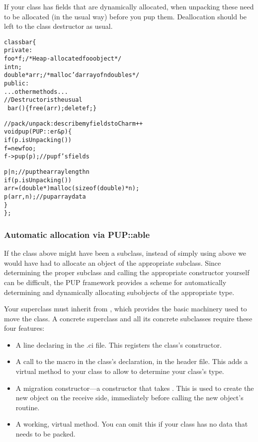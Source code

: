 If your class has fields that are dynamically allocated, when unpacking
these need to be allocated (in the usual way) before you pup them.
Deallocation should be left to the class destructor as usual.

\begin{alltt}
class bar \{
private:
    foo *f; /*Heap-allocated foo object*/
    int n;
    double *arr;/*malloc'd array of n doubles*/
public:
    ...other methods...
    //Destructor is the usual
    ~bar() \{free(arr);delete f;\}
    
    //pack/unpack: describe my fields to Charm++
    void pup(PUP::er &p) \{
      if (p.isUnpacking()) 
         f=new foo;
      f->pup(p);//pup f's fields
      
      p|n;//pup the array length n
      if (p.isUnpacking()) 
         arr=(double *)malloc(sizeof(double)*n);
      p(arr,n);//pup array data
    \}
\};
\end{alltt}


\subsubsection{Automatic allocation via PUP::able}
If the class  above might have been a subclass, instead of
simply using  above we would have had to allocate 
an object of the appropriate subclass.  Since determining the
proper subclass and calling the appropriate constructor yourself can be 
difficult, the PUP framework provides a scheme for automatically
determining and dynamically allocating subobjects of the appropriate type.

Your superclass must inherit from , which provides 
the basic machinery used to move the class.  
A concrete superclass and all its concrete subclasses require these
four features:

\begin{itemize}
\item A line declaring  in the .ci file.
This registers the class's constructor.

\item A call to the macro  in the
class's declaration, in the header file.  This adds a virtual 
method to your class to allow  to determine your class's type.

\item A migration constructor---a constructor that takes .
This is used to create the new object on the receive side, immediately
before calling the new object's  routine.

\item A working, virtual  method.  You can omit this if your
class has no data that needs to be packed.
\end{itemize}

